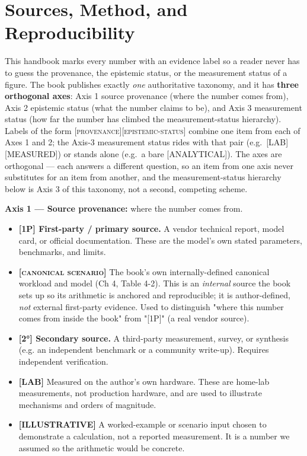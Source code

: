 \chapter{Sources, Method, and Reproducibility}
\label{chap:sources}

\noindent This handbook marks every number with an evidence label so a reader never has to guess the provenance, the epistemic status, or the measurement status of a figure. The book publishes exactly \emph{one} authoritative taxonomy, and it has \textbf{three orthogonal axes}: Axis 1 source provenance (where the number comes from), Axis 2 epistemic status (what the number claims to be), and Axis 3 measurement status (how far the number has climbed the measurement-status hierarchy). Labels of the form \textsc{[provenance][epistemic-status]} combine one item from each of Axes 1 and 2; the Axis-3 measurement status rides with that pair (e.g.~\textsc{[LAB][MEASURED]}) or stands alone (e.g.~a bare \textsc{[ANALYTICAL]}). The axes are orthogonal --- each answers a different question, so an item from one axis never substitutes for an item from another, and the measurement-status hierarchy below is Axis 3 of this taxonomy, not a second, competing scheme.

\medskip
\noindent\textbf{Axis 1 --- Source provenance:} where the number comes from.

\begin{itemize}\tightlist
\item \textbf{\textsc{[1P]} First-party / primary source.} A vendor technical report, model card, or official documentation. These are the model's own stated parameters, benchmarks, and limits.
\item \textbf{\textsc{[canonical scenario]}} The book's own internally-defined canonical workload and model (Ch 4, Table 4-2). This is an \emph{internal} source the book sets up so its arithmetic is anchored and reproducible; it is author-defined, \emph{not} external first-party evidence. Used to distinguish "where this number comes from inside the book" from "\textsc{[1P]}" (a real vendor source).
\item \textbf{\textsc{[2°]} Secondary source.} A third-party measurement, survey, or synthesis (e.g. an independent benchmark or a community write-up). Requires independent verification.
\item \textbf{\textsc{[LAB]}} Measured on the author's own hardware. These are home-lab measurements, not production hardware, and are used to illustrate mechanisms and orders of magnitude.
\item \textbf{\textsc{[ILLUSTRATIVE]}} A worked-example or scenario input chosen to demonstrate a calculation, not a reported measurement. It is a number we assumed so the arithmetic would be concrete.
\end{itemize}

